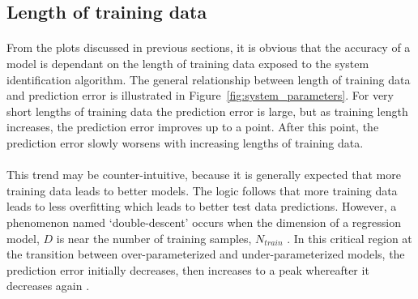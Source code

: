 
    \subsection{Length of training data}
    
        \paragraph{}
        From the plots discussed in previous sections, 
        it is obvious that the accuracy of a model is dependant 
        on the length of training data exposed to the system identification algorithm.
        The general relationship between length of training data and prediction error 
        is illustrated in Figure~\ref{fig:system_parameters}.
        For very short lengths of training data the prediction error is large, 
        but as training length increases, the prediction error improves up to a point.
        After this point, the prediction error slowly worsens with increasing lengths of training data.
        
        \paragraph{}
        This trend may be counter-intuitive, because it is generally expected that more training data leads to better models.
        The logic follows that more training data leads to less overfitting 
        which leads to better test data predictions.
        However, a phenomenon named `double-descent' occurs when the dimension of a regression model, $D$ 
        is near the number of training samples, $N_{train}$ \cite{Nakkiran2019}.
        In this critical region at the transition between over-parameterized and under-parameterized models,
        the prediction error initially decreases, then increases to a peak whereafter it decreases again \cite{Nakkiran2019}. 
        
